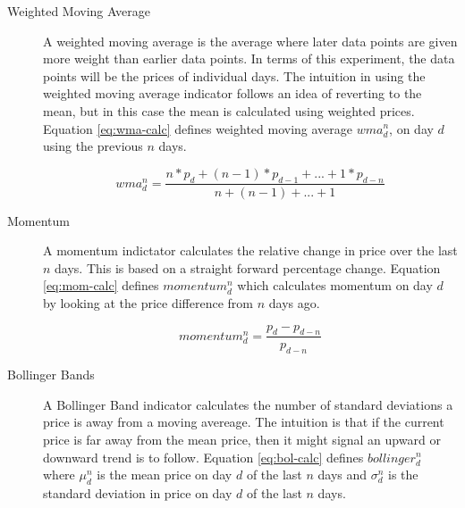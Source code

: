 \documentclass{report}
\begin{document}
\begin{description}
  \item[Weighted Moving Average] A weighted moving average is the average where later data points are given more weight than earlier data points. In terms of this experiment, the data points will be the prices of individual days. The intuition in using the weighted moving average indicator follows an idea of reverting to the mean, but in this case the mean is calculated using weighted prices. Equation \ref{eq:wma-calc} defines weighted moving average  $wma^{n}_{d}$, on day $d$ using the previous $n$ days.
 
  \begin{figure}[H]
  \begin{center}
      \begin{equation}
        wma^{n}_{d} = \dfrac{n * p_{d} + (n - 1) * p_{d-1} + ... + 1 * p_{d-n}} {n + (n - 1) + ... + 1}
        \label{eq:wma-calc}
      \end{equation}
  \end{center}
  \end{figure} 
    
  \item[Momentum]
  A momentum indictator calculates the relative change in price over the last $n$ days. This is based on a straight forward percentage change. Equation \ref{eq:mom-calc} defines $momentum^{n}_{d}$ which calculates momentum on day $d$ by looking at the price difference from $n$ days ago.
  
  \begin{figure}[H]
  \begin{center}
      \begin{equation}
        momentum^{n}_{d} = \dfrac{p_{d} - p_{d-n}} {p_{d-n}}
        \label{eq:mom-calc}
      \end{equation}
  \end{center}
  \end{figure}  
    
  \item[Bollinger Bands]
  A Bollinger Band indicator calculates the number of standard deviations a price is away from a moving avereage. The intuition is that if the current price is far away from the mean price, then it might signal an upward or downward trend is to follow. Equation \ref{eq:bol-calc} defines $bollinger^{n}_{d}$ where $\mu^{n}_{d}$ is the mean price on day $d$ of the last $n$ days and $\sigma^{n}_{d}$ is the standard deviation in price on day $d$ of the last $n$ days.
  

\end{description}
\end{document}
